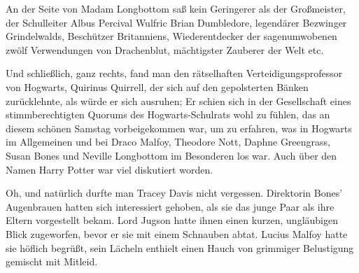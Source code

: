 An der Seite von Madam Longbottom saß kein Geringerer als der Großmeister, der Schulleiter Albus Percival Wulfric Brian Dumbledore, legendärer Bezwinger Grindelwalds, Beschützer Britanniens, Wiederentdecker der sagenumwobenen zwölf Verwendungen von Drachenblut, mächtigster Zauberer der Welt etc.

Und schließlich, ganz rechts, fand man den rätselhaften Verteidigungsprofessor von Hogwarts, Quirinus Quirrell, der sich auf den gepolsterten Bänken zurücklehnte, als würde er sich ausruhen; Er schien sich in der Gesellschaft eines stimmberechtigten Quorums des Hogwarts-Schulrats wohl zu fühlen, das an diesem schönen Samstag vorbeigekommen war, um zu erfahren, was in Hogwarts im Allgemeinen und bei Draco Malfoy, Theodore Nott, Daphne Greengrass, Susan Bones und Neville Longbottom im Besonderen los war. Auch über den Namen Harry Potter war viel diskutiert worden.

Oh, und natürlich durfte man Tracey Davis nicht vergessen. Direktorin Bones' Augenbrauen hatten sich interessiert gehoben, als sie das junge Paar als ihre Eltern vorgestellt bekam. Lord Jugson hatte ihnen einen kurzen, ungläubigen Blick zugeworfen, bevor er sie mit einem Schnauben abtat. Lucius Malfoy hatte sie höflich begrüßt, sein Lächeln enthielt einen Hauch von grimmiger Belustigung gemischt mit Mitleid.

